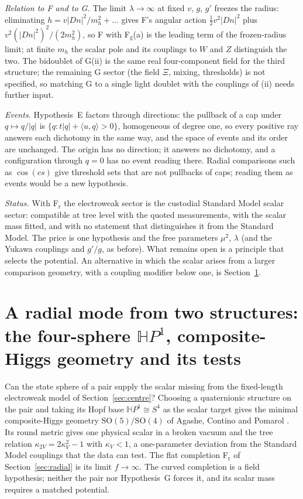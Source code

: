 \documentclass[aps,pra,onecolumn,superscriptaddress,nofootinbib,10pt]{revtex4-2}
\theoremstyle{definition}
\theoremstyle{remark}
\newcommand{\HH}{\mathbb{H}}
\newcommand{\ip}[2]{\langle #1,#2\rangle}
\newcommand{\SO}{\mathrm{SO}}
\begin{document}
\smallskip\noindent\emph{Relation to F and to G.}  The limit $\lambda\to\infty$ at fixed $v$, $g$, $g'$ freezes the radius:
eliminating $h=v\lvert Dn\rvert^2/m_h^2+\dots$ gives F's angular action $\tfrac12v^2\lvert Dn\rvert^2$ plus $v^2(\lvert Dn\rvert^2)^2/(2m_h^2)$, so F
with F$_{\mathrm g}$(a) is the leading term of the frozen-radius limit; at finite $m_h$ the scalar pole and its
couplings to $W$ and $Z$ distinguish the two.  The bidoublet of G(ii) is the same real four-component
field for the third structure; the remaining G sector (the field $\Xi$, mixing, thresholds) is not
specified, so matching G to a single light doublet with the couplings of (ii) needs further input.

\smallskip\noindent\emph{Events.}  Hypothesis~E factors through directions: the pullback of a cap under $q\mapsto q/\lvert q\rvert$
is $\{q:t\lvert q\rvert+\ip uq>0\}$, homogeneous of degree one, so every positive ray answers each dichotomy in the
same way, and the space of events and its order are unchanged.  The origin has no direction; it
answers no dichotomy, and a configuration through $q=0$ has no event reading there.  Radial
comparisons such as $\cos(cs)$ give threshold sets that are not pullbacks of caps; reading them as events
would be a new hypothesis.

\smallskip\noindent\emph{Status.}  With F$_{\mathrm r}$ the electroweak sector is the custodial Standard Model scalar sector:
compatible at tree level with the quoted measurements, with the scalar mass fitted, and with no
statement that distinguishes it from the Standard Model.  The price is one hypothesis and the free
parameters $\mu^2$, $\lambda$ (and the Yukawa couplings and $g'/g$, as before).  What remains open is a principle
that selects the potential.  An alternative in which the scalar arises from a larger comparison
geometry, with a coupling modifier below one, is Section~\ref{sec:hopfbase}.

\section{A radial mode from two structures: the four-sphere $\HH P^1$, composite-Higgs geometry and its tests}\label{sec:hopfbase}
Can the state sphere of a pair supply the scalar missing from the fixed-length electroweak model of
Section~\ref{sec:centre}?  Choosing a quaternionic structure on the pair and taking its Hopf base $\HH P^1\cong S^4$ as the
scalar target gives the minimal composite-Higgs geometry $\SO(5)/\SO(4)$ of Agashe, Contino and Pomarol
\cite{n7:ACP}.  Its round metric gives one physical scalar in a broken vacuum and the tree relation
$\kappa_{2V}=2\kappa_V^2-1$ with $\kappa_V<1$, a one-parameter deviation from the Standard Model couplings that the data can
test.  The flat completion F$_{\mathrm r}$ of Section~\ref{sec:radial} is its limit $f\to\infty$.  The curved completion is a field
hypothesis; neither the pair nor Hypothesis~G forces it, and its scalar mass requires a matched potential.
\end{document}
